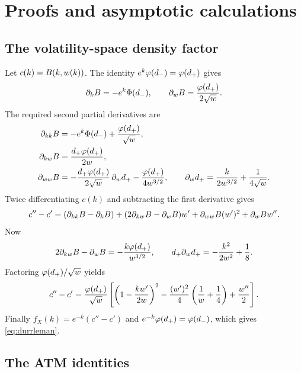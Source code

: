 \section{Proofs and asymptotic calculations}
\label{app:proofs}

\subsection{The volatility-space density factor}
\label{app:durrlemanproof}

Let $c(k)=B(k,w(k))$.  The identity
$e^k\varphi(d_-)=\varphi(d_+)$ gives
\[
\partial_kB=-e^k\Phi(d_-),
\qquad
\partial_wB=\frac{\varphi(d_+)}{2\sqrt w}.
\]
The required second partial derivatives are
\begin{align*}
\partial_{kk}B
&=-e^k\Phi(d_-)+\frac{\varphi(d_+)}{\sqrt w},\\
\partial_{kw}B
&=\frac{d_+\varphi(d_+)}{2w},\\
\partial_{ww}B
&=-\frac{d_+\varphi(d_+)}{2\sqrt w}\,\partial_wd_+
-\frac{\varphi(d_+)}{4w^{3/2}},
\qquad
\partial_wd_+=\frac{k}{2w^{3/2}}+\frac1{4\sqrt w}.
\end{align*}
Twice differentiating $c(k)$ and subtracting the first derivative gives
\[
c''-c'=(\partial_{kk}B-\partial_kB)
+(2\partial_{kw}B-\partial_wB)w'
+\partial_{ww}B(w')^2+\partial_wB w''.
\]
Now
\[
2\partial_{kw}B-\partial_wB
=-\frac{k\varphi(d_+)}{w^{3/2}},
\qquad
d_+\partial_wd_+=-\frac{k^2}{2w^2}+\frac18.
\]
Factoring $\varphi(d_+)/\sqrt w$ yields
\[
c''-c'=\frac{\varphi(d_+)}{\sqrt w}
\left[
\left(1-\frac{kw'}{2w}\right)^2
-\frac{(w')^2}{4}\left(\frac1w+\frac14\right)
+\frac{w''}{2}\right].
\]
Finally $f_X(k)=e^{-k}(c''-c')$ and
$e^{-k}\varphi(d_+)=\varphi(d_-)$, which gives \eqref{eq:durrleman}.

\subsection{The ATM identities}
\label{app:atmproof}

